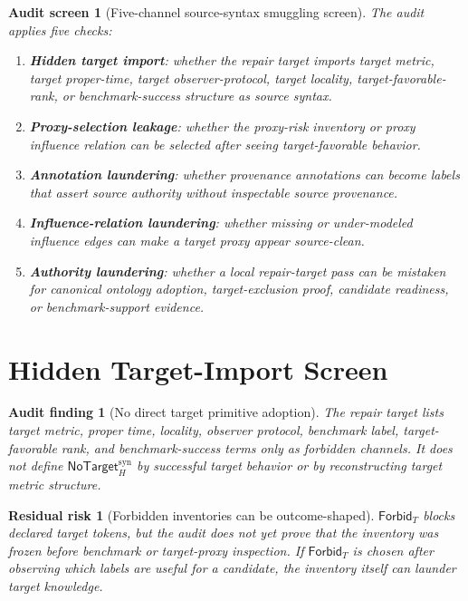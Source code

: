 \documentclass[11pt]{article}
\newcommand{\NoTargetSyn}{\mathsf{NoTarget}_{H}^{\mathrm{syn}}}
\newcommand{\ForbidT}{\mathsf{Forbid}_{T}}
\newtheorem{screen}{Audit screen}
\newtheorem{auditfinding}{Audit finding}
\newtheorem{residualrisk}{Residual risk}
\begin{document}
\begin{screen}[Five-channel source-syntax smuggling screen]
The audit applies five checks:
\begin{enumerate}
    \item \textbf{Hidden target import}: whether the repair target imports
    target metric, target proper-time, target observer-protocol, target
    locality, target-favorable-rank, or benchmark-success structure as
    source syntax.
    \item \textbf{Proxy-selection leakage}: whether the proxy-risk
    inventory or proxy influence relation can be selected after seeing
    target-favorable behavior.
    \item \textbf{Annotation laundering}: whether provenance annotations
    can become labels that assert source authority without inspectable
    source provenance.
    \item \textbf{Influence-relation laundering}: whether missing or
    under-modeled influence edges can make a target proxy appear
    source-clean.
    \item \textbf{Authority laundering}: whether a local repair-target pass
    can be mistaken for canonical ontology adoption, target-exclusion proof,
    candidate readiness, or benchmark-support evidence.
\end{enumerate}
\end{screen}

\section{Hidden Target-Import Screen}

\begin{auditfinding}[No direct target primitive adoption]
The repair target lists target metric, proper time, locality, observer
protocol, benchmark label, target-favorable rank, and benchmark-success
terms only as forbidden channels. It does not define \(\NoTargetSyn\) by
successful target behavior or by reconstructing target metric structure.
\end{auditfinding}

\begin{residualrisk}[Forbidden inventories can be outcome-shaped]
\(\ForbidT\) blocks declared target tokens, but the audit does not yet prove
that the inventory was frozen before benchmark or target-proxy inspection.
If \(\ForbidT\) is chosen after observing which labels are useful for a
candidate, the inventory itself can launder target knowledge.
\end{residualrisk}
\end{document}
